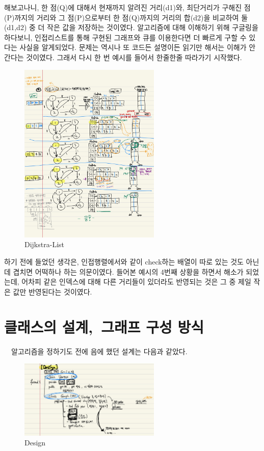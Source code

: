 \documentclass[a4paper,11pt]{article}
\begin{document}
해보고나니, 한 점(Q)에 대해서 현재까지 알려진 거리(d1)와, 최단거리가 구해진 점(P)까지의 거리와 그 점(P)으로부터 한 점(Q)까지의 거리의 합(d2)을 비교하여 둘(d1,d2) 중 더 작은 값을 저장하는 것이였다. 알고리즘에 대해 이해하기 위해 구글링을 하다보니, 인접리스트를 통해 구현된 그래프와 큐를 이용한다면 더 빠르게 구할 수 있다는 사실을 알게되었다. 문제는 역시나 또 코드든 설명이든 읽기만 해서는 이해가 안간다는 것이였다. 그래서 다시 한 번 예시를 들어서 한줄한줄 따라가기 시작했다. 
\begin{figure}[h]
\begin{center}
\includegraphics[width=0.6\textwidth]{DijstraList}
\caption{Dijkstra-List}
\label{fig:fig2}
\end{center}
\end{figure}


하기 전에 들었던 생각은, 인접행렬에서와 같이 check하는 배열이 따로 있는 것도 아닌데 겹치면 어떡하나 하는 의문이였다. 들어본 예시의 4번째 상황을 하면서 해소가 되었는데, 어차피 같은 인덱스에 대해 다른 거리들이 있더라도 반영되는 것은 그 중 제일 작은 값만 반영된다는 것이였다. 
\newpage
\section{클래스의 설계,\ 그래프 구성 방식}
\ \ 알고리즘을 정하기도 전에 음에 했던 설계는 다음과 같았다.
\begin{figure}[h]
\begin{center}
\includegraphics[width=0.6\textwidth]{design}
\caption{Design}
\label{fig:fig3}
\end{center}
\end{figure}
\end{document}
